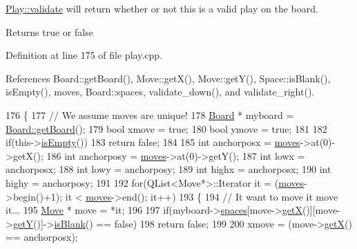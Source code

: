 \hyperlink{class_play_a498e6c1b124296872e22151e8ee965fb}{Play\-::validate} will return whether or not this is a valid play on the board. 

\begin{DoxyReturn}{Returns}
true or false 
\end{DoxyReturn}


Definition at line 175 of file play.\-cpp.



References Board\-::get\-Board(), Move\-::get\-X(), Move\-::get\-Y(), Space\-::is\-Blank(), is\-Empty(), moves, Board\-::spaces, validate\-\_\-down(), and validate\-\_\-right().


\begin{DoxyCode}
176 \{
177     \textcolor{comment}{// We assume moves are unique!}
178     \hyperlink{class_board}{Board} * myboard = \hyperlink{class_board_ae30e802b1d83309fc95e695b5b3df338}{Board::getBoard}();
179     \textcolor{keywordtype}{bool} xmove = \textcolor{keyword}{true};
180     \textcolor{keywordtype}{bool} ymove = \textcolor{keyword}{true};
181 
182     \textcolor{keywordflow}{if}(this->\hyperlink{class_play_af3ee40c18a0e3fbf6e16f645b8de248b}{isEmpty}())
183         \textcolor{keywordflow}{return} \textcolor{keyword}{false};
184 
185     \textcolor{keywordtype}{int} anchorposx = \hyperlink{class_play_ade35ae53bff24e1755a935899ee018ed}{moves}->at(0)->getX();
186     \textcolor{keywordtype}{int} anchorposy = \hyperlink{class_play_ade35ae53bff24e1755a935899ee018ed}{moves}->at(0)->getY();
187     \textcolor{keywordtype}{int} lowx = anchorposx;
188     \textcolor{keywordtype}{int} lowy = anchorposy;
189     \textcolor{keywordtype}{int} highx = anchorposx;
190     \textcolor{keywordtype}{int} highy = anchorposy;
191 
192     \textcolor{keywordflow}{for}(QList<Move*>::Iterator it = (\hyperlink{class_play_ade35ae53bff24e1755a935899ee018ed}{moves}->begin()+1); it < \hyperlink{class_play_ade35ae53bff24e1755a935899ee018ed}{moves}->end(); it++)
193     \{
194         \textcolor{comment}{// It want to move it move it...}
195         \hyperlink{class_move}{Move} * move = *it;
196 
197         \textcolor{keywordflow}{if}(myboard->\hyperlink{class_board_a73b12248ddb6ee3adc24f4458d8661c2}{spaces}[move->\hyperlink{class_move_a7e3169f48fcca1aa1de4a5cbe67a284d}{getX}()][move->\hyperlink{class_move_af388d15d91f61a1f909998f50988ac1a}{getY}()]->\hyperlink{class_space_a308f0ef400183df78df69717ca50cfee}{isBlank}() == \textcolor{keyword}{false})
198             \textcolor{keywordflow}{return} \textcolor{keyword}{false};
199 
200         xmove = (move->\hyperlink{class_move_a7e3169f48fcca1aa1de4a5cbe67a284d}{getX}() == anchorposx);

\end{DoxyCode}
